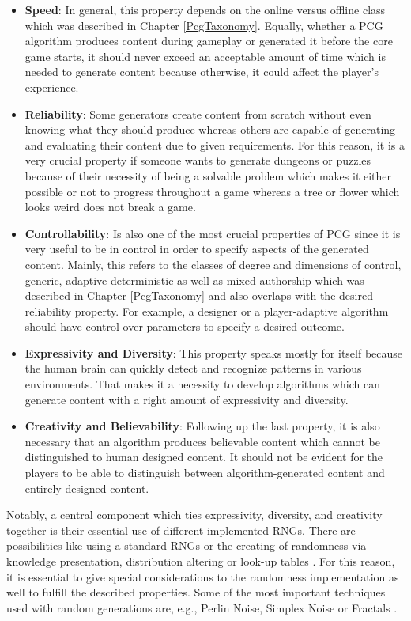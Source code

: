 \documentclass[MGS,Master,english]{twbook}%
\begin{document}
\begin{itemize}
	\item \textbf{Speed}: In general, this property depends on the online versus offline class which was described in Chapter \ref{PcgTaxonomy}. Equally, whether a \ac{PCG} algorithm produces content during gameplay or generated it before the core game starts, it should never exceed an acceptable amount of time which is needed to generate content because otherwise, it could affect the player’s experience. \cite{pcg::book}
	\item \textbf{Reliability}: Some generators create content from scratch without even knowing what they should produce whereas others are capable of generating and evaluating their content due to given requirements. For this reason, it is a very crucial property if someone wants to generate dungeons or puzzles because of their necessity of being a solvable problem which makes it either possible or not to progress throughout a game whereas a tree or flower which looks weird does not break a game. \cite{pcg::book}
	\item \textbf{Controllability}: Is also one of the most crucial properties of \ac{PCG} since it is very useful to be in control in order to specify aspects of the generated content. Mainly, this refers to the classes of degree and dimensions of control, generic, adaptive deterministic as well as mixed authorship which was described in Chapter \ref{PcgTaxonomy} and also overlaps with the desired reliability property. For example, a designer or a player-adaptive algorithm should have control over parameters to specify a desired outcome. \cite{pcg::book}
	\item \textbf{Expressivity and Diversity}: This property speaks mostly for itself because the human brain can quickly detect and recognize patterns in various environments. That makes it a necessity to develop algorithms which can generate content with a right amount of expressivity and diversity. \cite{pcg::book}
	\item \textbf{Creativity and Believability}: Following up the last property, it is also necessary that an algorithm produces believable content which cannot be distinguished to human designed content. It should not be evident for the players to be able to distinguish between algorithm-generated content and entirely designed content. \cite{pcg::book}
\end{itemize}

Notably, a central component which ties expressivity, diversity, and creativity together is their essential use of different implemented RNGs. There are possibilities like using a standard RNGs or the creating of randomness via knowledge presentation, distribution altering or look-up tables \cite{pcg::book}. For this reason, it is essential to give special considerations to the randomness implementation as well to fulfill the described properties. Some of the most important techniques used with random generations are, e.g., Perlin Noise, Simplex Noise or Fractals \cite{pcg::shortHistoryOfDynamicAndPCG}.
\end{document}
